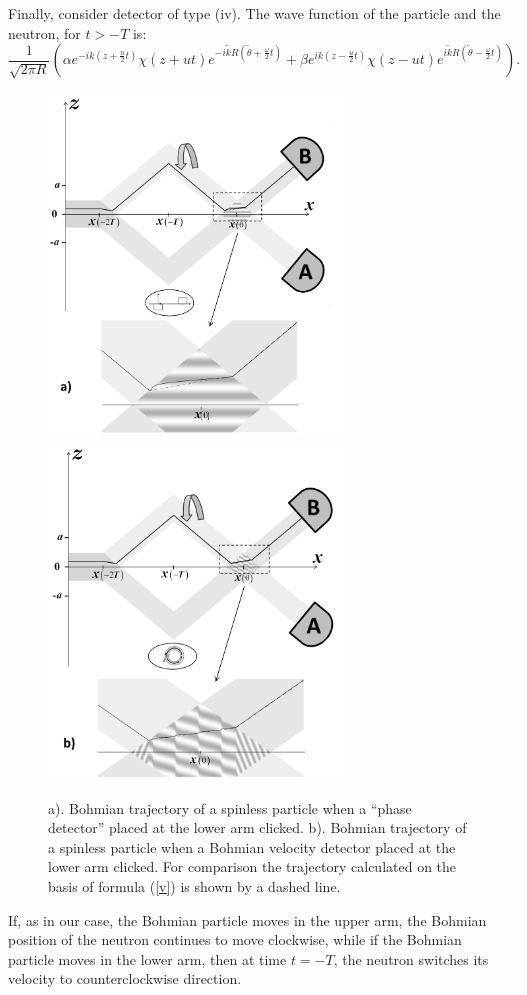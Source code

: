 \documentclass[preprint,tightenlines]{elsarticle}
\begin{document}
Finally, consider detector of type (iv). The wave function of the
particle and the neutron, for $t>-T$ is:
 \begin{equation}
\frac{1}{\sqrt{2\pi R}}\left(\alpha e^{-ik(z+\frac{u}{2}t)}\chi(z+ut)e^{-i\tilde{k}R(\tilde{\theta}+\frac{\omega}{2}t)}+\beta e^{ik(z-\frac{u}{2}t)}\chi(z-ut)e^{i\tilde{k}R(\tilde{\theta}-\frac{\omega}{2}t)}\right).\label{psioutnox4ns}
\end{equation}
\begin{figure}[H]\vspace{-10pt}
     \includegraphics[width=8cm]{9a.pdf}\\\vspace{-5pt}
         \includegraphics[width=8cm]{9b.pdf}\\\vspace{-10pt}
    \caption{a). Bohmian  trajectory of a spinless particle when a ``phase detector'' placed at the lower arm clicked.
   b). Bohmian  trajectory of a spinless particle when a Bohmian velocity  detector placed at the lower arm clicked.
   For comparison the  trajectory calculated on the basis of formula (\ref{v}) is shown by a dashed line.}
\end{figure}
If,  as in our case, the Bohmian particle moves in the upper arm,
the Bohmian position of the neutron continues to move clockwise, while
if the Bohmian particle moves in the lower arm, then at time $t=-T$, the
neutron switches its velocity to counterclockwise direction.
\end{document}
